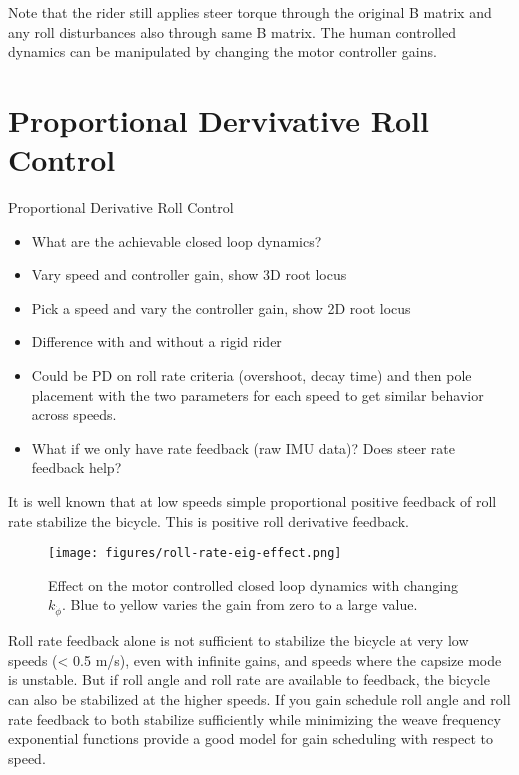 \documentclass[12pt]{article}
\begin{document}
Note that the rider still applies steer torque through the original B matrix
and any roll disturbances also through same B matrix. The human controlled
dynamics can be manipulated by changing the motor controller gains.

\section{Proportional Dervivative Roll Control}

Proportional Derivative Roll Control

\begin{itemize}
  \item What are the achievable closed loop dynamics?
  \item Vary speed and controller gain, show 3D root locus
  \item Pick a speed and vary the controller gain, show 2D root locus
  \item Difference with and without a rigid rider
  \item Could be PD on roll rate criteria (overshoot, decay time) and then pole
    placement with the two parameters for each speed to get similar behavior
    across speeds.
  \item What if we only have rate feedback (raw IMU data)? Does steer rate
    feedback help?
\end{itemize}

It is well known that at low speeds simple proportional positive feedback of
roll rate stabilize the bicycle. This is positive roll derivative feedback.

\begin{figure}
  \centering
  \texttt{[image: figures/roll-rate-eig-effect.png]}
  \caption{Effect on the motor controlled closed loop dynamics with changing
  \(k_{\dot{\phi}}\). Blue to yellow varies the gain from zero to a large
  value.}
  \label{fig:roll-rate-eig-effect}
\end{figure}

Roll rate feedback alone is not sufficient to stabilize the bicycle at very low
speeds (< 0.5 m/s), even with infinite gains, and speeds where the capsize mode
is unstable. But if roll angle and roll rate are available to feedback, the
bicycle can also be stabilized at the higher speeds. If you gain schedule roll
angle and roll rate feedback to both stabilize sufficiently while minimizing
the weave frequency exponential functions provide a good model for gain
scheduling with respect to speed.
\end{document}
